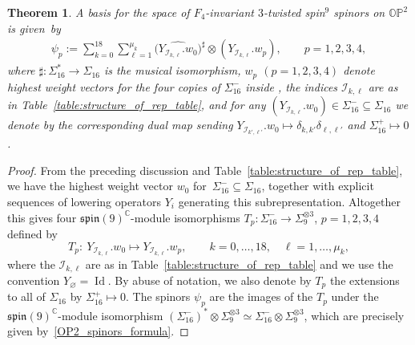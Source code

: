 \documentclass[pdftex]{sigma}
\numberwithin{equation}{section}
\newtheorem{Theorem}{Theorem}[section]
\newcommand{\C}{\mathbb{C}} %
\newcommand{\OP}{\mathbb{OP}}
\DeclareMathOperator{\Id}{Id}
\begin{document}
		\begin{Theorem}\label{OP2_inv_spinors_theorem}
			A basis for the space of $F_4$-invariant $3$-twisted spin$^9$ spinors on $\OP^2$ is given~by
			\begin{align}\label{OP2_spinors_formula}
				\psi_{p}:= \sum_{k=0}^{18} \sum_{\ell=1}^{\mu_k} \bigl(\widehat{Y_{\mathcal{I}_{k,\ell}}.w_0}\bigr)^{\sharp}\otimes (Y_{\mathcal{I}_{k,\ell}}.w_p ) , \qquad p=1,2,3,4,
			\end{align}
			where $\sharp\colon \Sigma_{16}^* \to \Sigma_{16}$ is the musical isomorphism, $w_p$ $(p=1,2,3,4)$ denote highest weight vectors for the four copies of $\Sigma_{16}^-$ inside , the indices $\mathcal{I}_{k,\ell}$ are as in Table~{\rm\ref{table:structure_of_rep_table}}, and for any $(Y_{\mathcal{I}_{k,\ell}}.w_0 )\in \Sigma_{16}^- \subseteq \Sigma_{16}$ we denote by  the corresponding dual map sending $Y_{\mathcal{I}_{k',\ell'}}.w_0\mapsto \delta_{k,k'}\delta_{\ell,\ell'}$ and $\Sigma_{16}^+\mapsto 0$.
		\end{Theorem}
		\begin{proof}
			From the preceding discussion and Table~\ref{table:structure_of_rep_table}, we have the highest weight vector $w_0$ for~${\Sigma_{16}^- \subseteq \Sigma_{16}}$, together with explicit sequences of lowering operators $Y_i$ generating this subrepresentation. Altogether this gives four $\mathfrak{spin}(9)^{\C}$-module isomorphisms $T_{p}\colon \Sigma_{16}^- \to \Sigma_9^{\otimes 3}$, $p=1,2,3,4$ defined by
			\[
			T_{p} \colon\ Y_{\mathcal{I}_{k,\ell}}.w_0 \mapsto Y_{\mathcal{I}_{k,\ell}}.w_p, \qquad k=0,\dots, 18, \quad \ell = 1,\dots, \mu_k,
			\]
			where the $\mathcal{I}_{k,\ell}$ are as in Table~\ref{table:structure_of_rep_table} and we use the convention $Y_{\varnothing}= \Id$. By abuse of notation, we also denote by $T_p$ the extensions to all of $\Sigma_{16}$ by $\Sigma_{16}^+\mapsto 0$. The spinors $\psi_p$ are the images of the $T_p$ under the $\mathfrak{spin}(9)^{\C}$-module isomorphism $(\Sigma_{16}^-)^* \otimes \Sigma_9^{\otimes 3} \simeq \Sigma_{16}^- \otimes \Sigma_9^{\otimes 3}$, which are precisely given by~\eqref{OP2_spinors_formula}.
		\end{proof}
		
\end{document}
